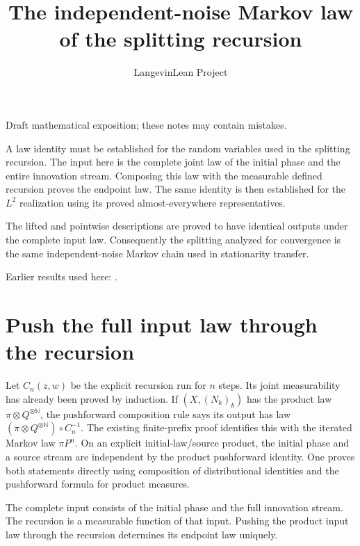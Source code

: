 \documentclass[11pt,a4paper]{article}
\title{\texorpdfstring{The independent-noise Markov law of the splitting recursion}{The independent-noise Markov law of the splitting recursion}}
\author{LangevinLean Project}
\date{}
\begin{document}
\maketitle
Draft mathematical exposition; these notes may contain mistakes.


A law identity must be established for the random variables used in the splitting recursion. The input here is the complete joint law of the initial phase and the entire innovation stream. Composing this law with the measurable defined recursion proves the endpoint law. The same identity is then established for the \(L^{2}\) realization using its proved almost-everywhere representatives.



The lifted and pointwise descriptions are proved to have identical outputs under the complete input law. Consequently the splitting analyzed for convergence is the same independent-noise Markov chain used in stationarity transfer.



Earlier results used here: \cite[Section~3.33]{LangevinLean2026ULASC}.

\section{\texorpdfstring{Push the full input law through the recursion}{Push the full input law through the recursion}}


Let \(C_n(z,w)\) be the explicit recursion run for \(n\) steps. Its joint measurability has already been proved by induction. If \((X,(N_k)_k)\) has the product law \(\pi\otimes Q^{\otimes\mathbb N}\), the pushforward composition rule says its output has law \((\pi\otimes Q^{\otimes\mathbb N})\circ C_n^{-1}\). The existing finite-prefix proof identifies this with the iterated Markov law \(\pi P^n\). On an explicit initial-law/\allowbreak{}source product, the initial phase and a source stream are independent by the product pushforward identity. One proves both statements directly using composition of distributional identities and the pushforward formula for product measures.



The complete input consists of the initial phase and the full innovation stream. The recursion is a measurable function of that input. Pushing the product input law through the recursion determines its endpoint law uniquely.
\end{document}
